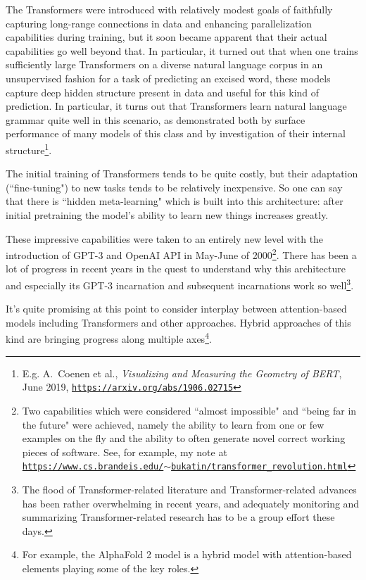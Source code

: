 \documentclass{article}
\begin{document}
The Transformers were introduced with relatively
modest goals of faithfully capturing long-range connections in data and enhancing parallelization capabilities
during training, but it soon became apparent that their actual capabilities go well beyond that. In particular,
it turned out that when one trains sufficiently large Transformers on a diverse natural language corpus
in an unsupervised fashion for a task of predicting an excised word, these models capture deep hidden structure present
in data and
useful for this kind of prediction. In particular, it turns out that Transformers learn natural language grammar quite
well in this scenario, as demonstrated both by surface performance of many models of this class and by
investigation of their internal structure\footnote{E.g. A.~Coenen et al., {\em Visualizing and Measuring the Geometry of BERT}, June 2019, \href{https://arxiv.org/abs/1906.02715}{\tt https://arxiv.org/abs/1906.02715}}.

The initial training of Transformers tends to be quite costly, but their adaptation (``fine-tuning") to new tasks
tends to be relatively inexpensive. So one can say that there is ``hidden meta-learning" which is built into
this architecture: after initial pretraining the model's ability to learn new things increases greatly.

These impressive capabilities were taken to an entirely new level with the introduction of GPT-3 and OpenAI API in
May-June of 2000\footnote{Two capabilities which were considered ``almost impossible" and ``being far in the future" were achieved,
namely the ability to learn from one or few examples on the fly and the ability to often generate novel correct working pieces of software.
See, for example, my note at \href{https://www.cs.brandeis.edu/~bukatin/transformer\_revolution.html}{\tt https://www.cs.brandeis.edu/$\sim$bukatin/transformer\_revolution.html}}. There has been a lot of progress in recent years in the quest to understand why this architecture and especially its GPT-3 incarnation and subsequent incarnations work so well\footnote{The flood of Transformer-related literature and Transformer-related advances has been rather overwhelming in recent years, and adequately monitoring
and summarizing Transformer-related research has to be a group effort these days.}.

It's quite promising at this point to consider interplay between attention-based models including Transformers and
other approaches. Hybrid approaches of this kind are bringing progress along multiple axes\footnote{For example,
the AlphaFold 2 model is a hybrid model with attention-based elements playing some of the key roles.}.
\end{document}
